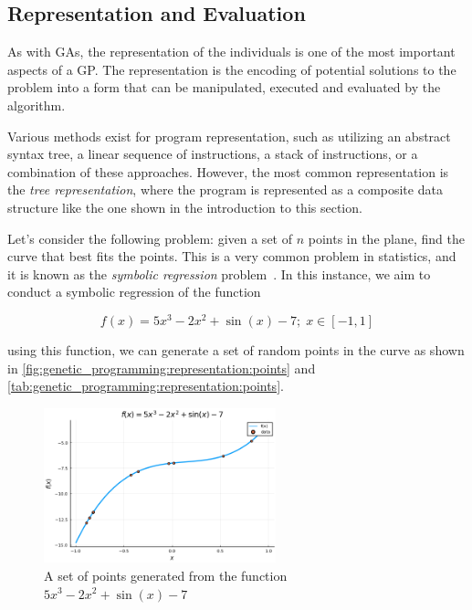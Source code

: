 \subsection{Representation and Evaluation}
\label{sec:genetic_programming:representation}
  As with GAs, the representation of the individuals is one of the most 
  important aspects of a GP.
  The representation is the encoding of potential solutions to the problem into
  a form that can be manipulated, executed and evaluated by the algorithm.

  Various methods exist for program representation, such as utilizing an abstract 
  syntax tree, a linear sequence of instructions, a stack of instructions, or a combination of these approaches.
  However, the most common representation is the \emph{tree representation}, where
  the program is represented as a composite data structure like the one shown in
  the introduction to this section.

  Let's consider the following problem: given a set of \(n\) points in the 
  plane, find the curve that best fits the points.
  This is a very common problem in statistics, and it is known as the
  \emph{symbolic regression} 
  problem~\autocite{kozaGeneticProgrammingProgramming1992a}.
  In this instance, we aim to conduct a symbolic regression of the function

  \begin{equation}
    f(x) = 5x^3 - 2x^2 + \sin(x) - 7;\; x \in [-1, 1]
  \end{equation}

  using this function, we can generate a set of random points in the curve as
  shown in \vref{fig:genetic_programming:representation:points} and 
  \vref{tab:genetic_programming:representation:points}.

  \begin{figure}[ht!]
    \centering
    \includegraphics[width=0.6\textwidth]{img/theoretical_framework/symbolic.png}
    \caption{
      A set of points generated from the function \(5x^3 - 2x^2 + \sin(x) - 7\)
    }
    \label{fig:genetic_programming:representation:points}
  \end{figure}

